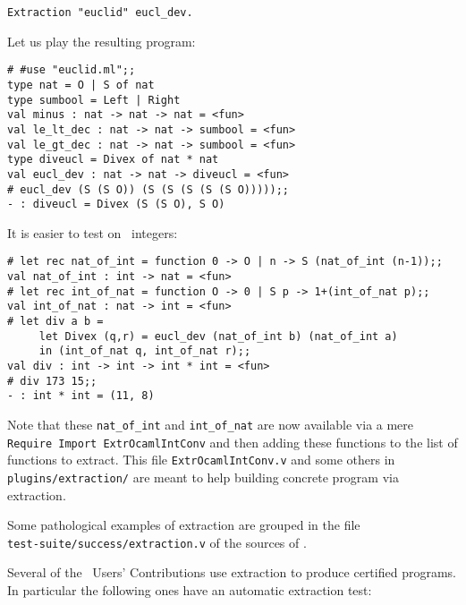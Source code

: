 \begin{verbatim}
Extraction "euclid" eucl_dev.
\end{verbatim}

\noindent Let us play the resulting program:

\begin{verbatim}
# #use "euclid.ml";;
type nat = O | S of nat
type sumbool = Left | Right
val minus : nat -> nat -> nat = <fun>
val le_lt_dec : nat -> nat -> sumbool = <fun>
val le_gt_dec : nat -> nat -> sumbool = <fun>
type diveucl = Divex of nat * nat
val eucl_dev : nat -> nat -> diveucl = <fun>
# eucl_dev (S (S O)) (S (S (S (S (S O)))));;
- : diveucl = Divex (S (S O), S O)
\end{verbatim}
It is easier to test on \ocaml\ integers:
\begin{verbatim}
# let rec nat_of_int = function 0 -> O | n -> S (nat_of_int (n-1));;
val nat_of_int : int -> nat = <fun>
# let rec int_of_nat = function O -> 0 | S p -> 1+(int_of_nat p);;
val int_of_nat : nat -> int = <fun>
# let div a b = 
     let Divex (q,r) = eucl_dev (nat_of_int b) (nat_of_int a)
     in (int_of_nat q, int_of_nat r);;
val div : int -> int -> int * int = <fun>
# div 173 15;;
- : int * int = (11, 8)
\end{verbatim}

\noindent Note that these {\tt nat\_of\_int} and {\tt int\_of\_nat} are now
available via a mere {\tt Require Import ExtrOcamlIntConv} and then
adding these functions to the list of functions to extract. This file
{\tt ExtrOcamlIntConv.v} and some others in {\tt plugins/extraction/}
are meant to help building concrete program via extraction.


Some pathological examples of extraction are grouped in the file\\
{\tt test-suite/success/extraction.v} of the sources of \Coq.


Several of the \Coq\ Users' Contributions use extraction to produce
certified programs. In particular the following ones have an automatic
extraction test:

